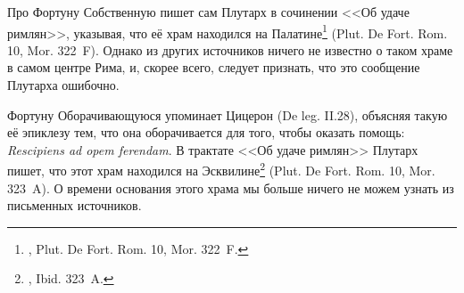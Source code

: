 Про Фортуну Собственную пишет сам Плутарх в сочинении <<Об удаче римлян>>, указывая, что её храм находился на Палатине\footnote{, Plut. De Fort. Rom. 10, Mor. 322~F.} (Plut. De Fort. Rom. 10, Mor. 322~F). Однако из других источников ничего не известно о таком храме в самом центре Рима, и, скорее всего, следует признать, что это сообщение Плутарха ошибочно.

Фортуну Оборачивающуюся\label{FortunaRescipiens} упоминает Цицерон (De leg. II.28), объясняя такую её эпиклезу тем, что она оборачивается для того, чтобы оказать помощь: \textit{Rescipiens ad opem ferendam}. В трактате <<Об удаче римлян>> Плутарх пишет, что этот храм находился на Эсквилине\footnote{, Ibid. 323~A.} (Plut. De Fort. Rom. 10, Mor. 323~A). О времени основания этого храма мы больше ничего не можем узнать из письменных источников.


